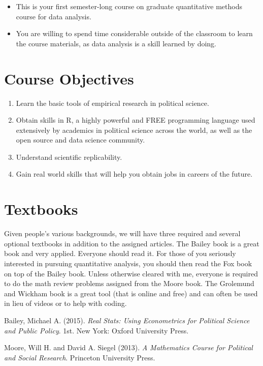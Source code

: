 \documentclass[11pt,]{article}
\begin{document}
\begin{itemize}
\item
  This is your first semester-long course on graduate quantitative
  methods course for data analysis.
\item
  You are willing to spend time considerable outside of the classroom to
  learn the course materials, as data analysis is a skill learned by
  doing.
\end{itemize}

\section{Course Objectives}\label{course-objectives}

\begin{enumerate}
\def\labelenumi{\arabic{enumi}.}
\item
  Learn the basic tools of empirical research in political science.
\item
  Obtain skills in R, a highly powerful and FREE programming language
  used extensively by academics in political science across the world,
  as well as the open source and data science community.
\item
  Understand scientific replicability.
\item
  Gain real world skills that will help you obtain jobs in careers of
  the future.
\end{enumerate}

\section{Textbooks}\label{textbooks}

Given people's various backgrounds, we will have three required and
several optional textbooks in addition to the assigned articles. The
Bailey book is a great book and very applied. Everyone should read it.
For those of you seriously interested in pursuing quantitative analysis,
you should then read the Fox book on top of the Bailey book. Unless
otherwise cleared with me, everyone is required to do the math review
problems assigned from the Moore book. The Grolemund and Wickham book is
a great tool (that is online and free) and can often be used in lieu of
videos or to help with coding.

 Bailey, Michael A. (2015).
\emph{Real Stats: Using Econometrics for Political
Science and Public Policy}. 1st. New York: Oxford University Press.

 Moore, Will H. and David A. Siegel (2013).
\emph{A Mathematics Course for Political and Social Research}. Princeton
University Press.
\end{document}
